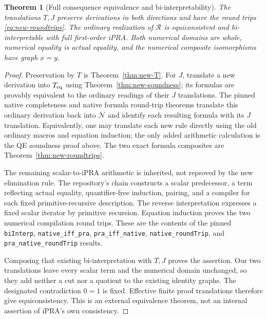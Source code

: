 \documentclass[11pt,a4paper]{article}
\newtheorem{theorem}{Theorem}[section]
\theoremstyle{definition}\newtheorem{definition}[theorem]{Definition}
\begin{document}
\begin{theorem}[Full consequence equivalence and bi-interpretability]
\label{thm:new-biinterpretability}
The translations $T,J$ preserve derivations in both directions and have the
round trips \eqref{eq:new-roundtrips}.  The ordinary realization of
$\mathcal R$ is equiconsistent and bi-interpretable with full first-order
iPRA.  Both numerical domains are whole, numerical equality is actual
equality, and the numerical composite isomorphisms have graph $x=y$.
\end{theorem}
\begin{proof}
Preservation by $T$ is Theorem~\ref{thm:new-T}.  For $J$, translate a new
derivation into $T_{\rm eq}$ using Theorem~\ref{thm:new-soundness}; its
formulas are provably equivalent to the ordinary readings of their $J$
translations.  The pinned
native completeness and native formula round-trip theorems translate this
ordinary derivation back into $\mathcal N$ and identify each resulting
formula with its $J$ translation.  Equivalently, one may translate each new
rule directly using the old ordinary macros and equation induction; the
only added arithmetic calculation is the QE soundness proof above.
The two exact formula composites are Theorem~\ref{thm:new-roundtrips}.

The remaining scalar-to-iPRA arithmetic is inherited, not reproved by the
new elimination rule.  The repository's chain constructs a scalar
predecessor, a term reflecting actual equality, quantifier-free induction,
pairing, and a compiler for each fixed primitive-recursive description.
The reverse interpretation expresses a fixed scalar iterator by primitive
recursion.  Equation induction proves the two numerical compilation round
trips.  These are the contents of the pinned \texttt{biInterp},
\texttt{native\_iff\_pra}, \texttt{pra\_iff\_native},
\texttt{native\_roundTrip}, and \texttt{pra\_native\_roundTrip} results.\cite{native,bridge}

Composing that existing bi-interpretation with $T,J$ proves the assertion.
Our two translations leave every scalar term and the numerical domain
unchanged, so they add neither a cut nor a quotient to the existing
identity graphs.  The designated contradiction $0=1$ is fixed.  Effective
finite proof translations therefore give equiconsistency.  This is an
external equivalence theorem, not an internal assertion of iPRA's own
consistency.
\end{proof}
\end{document}

